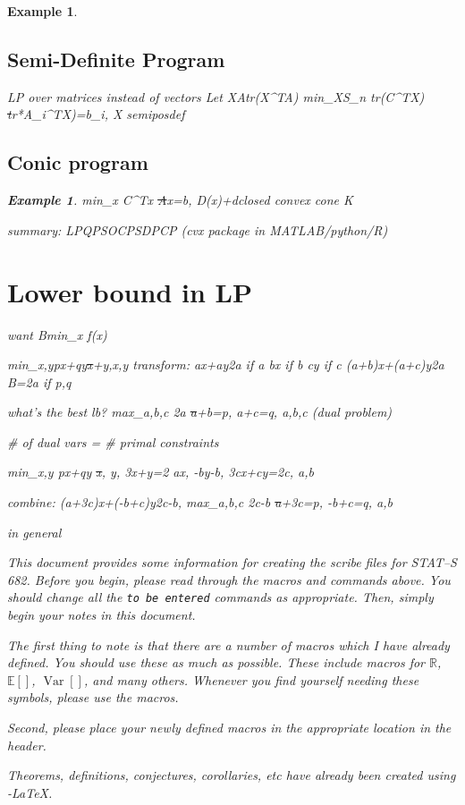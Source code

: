 \documentclass[10pt]{article}
\newtheorem{example}[ex]{Example}
\newcommand{\Expect}[1]{\mathbb{E}\!\left[#1\right]}
\newcommand{\R}{\mathbb{R}}
\DeclareMathOperator*{\Variance}{Var}
\newcommand{\Var}[1]{\Variance\!\left[#1\right]}
\begin{document}
\begin{example}
\subsection*{Semi-Definite Program}
LP over matrices instead of vectors
Let X\cdot A\equiv tr(X^TA)
min_{X\in S_n} tr(C^TX) \st tr*A_i^TX)=b_i, X semiposdef

\subsection*{Conic program}
\begin{example}
  min_x C^Tx \st Ax=b, D(x)+d\in closed convex cone K

  summary:
  LP\subset QP\subset SOCP\subset SDP\subset CP
  (cvx package in MATLAB/python/R)
  


\section*{Lower bound in LP}
want B\leq min_x f(x)

min_{x,y}px+qy\st x+y,x,y
transform:
ax+ay\geq 2a if a
bx if b
cy if c
\then (a+b)x+(a+c)y\geq2a
\then B=2a if p,q

what's the best lb?
max_{a,b,c} 2a \st a+b=p, a+c=q, a,b,c (dual problem)

# of dual vars = # primal constraints

min_x,y px+qy \st x, y, 3x+y=2
\to ax, -by\geq-b, 3cx+cy=2c, a,b

combine: (a+3c)x+(-b+c)y\geq2c-b,
max_a,b,c 2c-b \st a+3c=p, -b+c=q, a,b

in general


This document provides some information for creating the scribe files
for STAT--S 682. Before you begin, please read through the macros and
commands above. You should change all the {\tt to be entered} commands
as appropriate. Then, simply begin your notes in this document. 

The first thing to note is that there are a number of
macros which I have already defined. You should use these as much as
possible. These include macros for $\R$, $\Expect{}$, $\Var{}$, and
many others. Whenever you find yourself needing these symbols, please
use the macros.

Second, please place your newly defined macros in the appropriate
location in the header.

Theorems, definitions, conjectures, corollaries, etc have already been
created using \AmS-\LaTeX.


\end{example}
\end{example}
\end{document}
